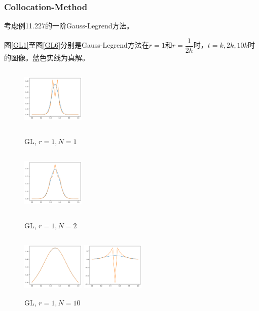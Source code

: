 \documentclass{ctexart}
\begin{document}
\subsubsection{Collocation-Method}

考虑例11.227的一阶Gauss-Legrend方法。

图\ref{GL1}至图\ref{GL6}分别是Gauss-Legrend方法在$r=1$和$r=\dfrac 1{2h}$时，$t=k,2k,10k$时的图像。蓝色实线为真解。

\begin{figure}[htbp]
	\begin{minipage}{5cm}
		\centering
		\includegraphics[width = 3cm, height = 3cm]{2-5-1.png}
		\caption{GL, $r=1,N=1$}
		\label{GL1}
	\end{minipage}
	\begin{minipage}{5cm}
		\centering
		\includegraphics[width = 3cm, height = 3cm]{2-5-2.png}
		\caption{GL, $r=1,N=2$}
		\label{GL2}
	\end{minipage}
	\begin{minipage}{5cm}
		\centering
		\includegraphics[width = 3cm, height = 3cm]{2-5-3.png}
		\caption{GL, $r=1,N=10$}
		\label{GL3}
	\end{minipage}
	\begin{minipage}{5cm}
		\centering
		\includegraphics[width = 3cm, height = 3cm]{2-6-1.png}

\end{minipage}
\end{figure}
\end{document}

